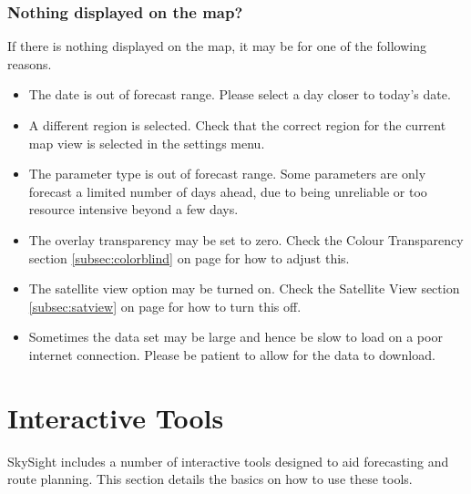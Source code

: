 \documentclass[11pt,a4paper]{article}
\begin{document}
\subsubsection{Nothing displayed on the map?}
If there is nothing displayed on the map, it may be for one of the following reasons.
\begin{itemize}
\item The date is out of forecast range. Please select a day closer to today's date.
\item A different region is selected. Check that the correct region for the current map view is selected in the settings menu.
\item The parameter type is out of forecast range. Some parameters are only forecast a limited number of days ahead, due to being unreliable or too resource intensive beyond a few days.
\item The overlay transparency may be set to zero. Check the Colour Transparency section \ref{subsec:colorblind} on page \pageref{subsec:colorblind} for how to adjust this.
\item The satellite view option may be turned on. Check the Satellite View section \ref {subsec:satview} on page \pageref{subsec:satview} for how to turn this off.
\item Sometimes the data set may be large and hence be slow to load on a poor internet connection. Please be patient to allow for the data to download.
\end{itemize}

\section{Interactive Tools}
SkySight includes a number of interactive tools designed to aid forecasting and route planning. This section details the basics on how to use these tools.
\end{document}
